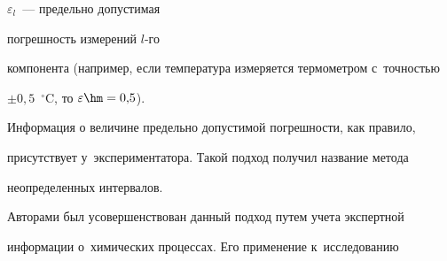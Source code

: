$\varepsilon_l$~--- предельно допустимая\linebreak\vspace*{-12pt}










\noindent


 погрешность измерений $l$-го 


компонента (например, если температура измеряется термометром с~точностью 


$\pm0{,}5$~$^\circ$C, то $\varepsilon\hm=0{,}5$).











  Информация о величине предельно допустимой погрешности, как правило, 


присутствует у~экспериментатора. Такой подход получил название метода 


неопределенных интервалов.








  


  Авторами был усовершенствован данный подход путем учета экспертной 


информации о~химических процессах. Его применение к~исследова\-нию 


